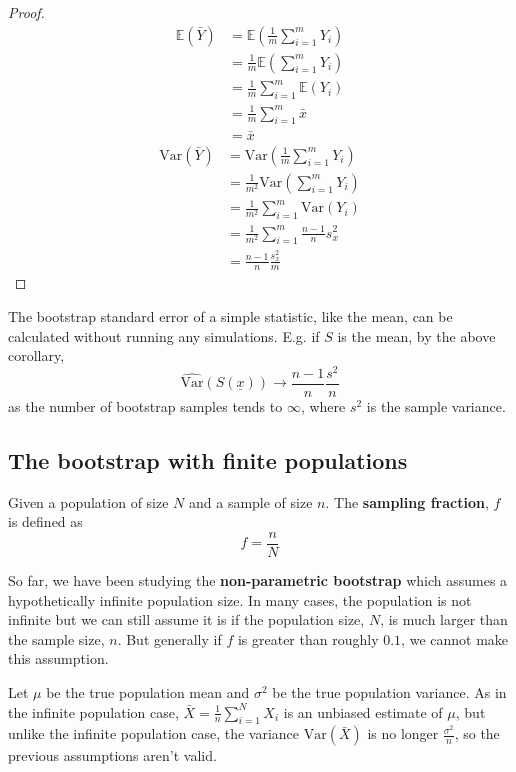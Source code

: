 \begin{proof}
	\[
		\begin{aligned}
			\mathbb{E}(\bar{Y})
				& = \mathbb{E} \left( \frac{1}{m} \sum_{i = 1}^m Y_i \right) \\
				& = \frac{1}{m} \mathbb{E} \left( \sum_{i = 1}^m Y_i \right) \\
				& = \frac{1}{m} \sum_{i = 1}^m \mathbb{E}(Y_i) \\
				& = \frac{1}{m} \sum_{i = 1}^m \bar{x} \\
				& = \bar{x}
		\end{aligned}
	\]
	\[
		\begin{aligned}
			\text{Var}(\bar{Y})
				& = \text{Var} \left( \frac{1}{m} \sum_{i = 1}^m Y_i \right) \\
				& = \frac{1}{m^2} \text{Var} \left( \sum_{i = 1}^m Y_i \right) \\
				& = \frac{1}{m^2} \sum_{i = 1}^m \text{Var}(Y_i) \\
				& = \frac{1}{m^2} \sum_{i = 1}^m \frac{n - 1}{n} s_x^2 \\
				& = \frac{n - 1}{n} \frac{s_x^2}{m}
		\end{aligned}
	\]
\end{proof}

\begin{remark}
	The bootstrap standard error of a simple statistic, like the mean, can be calculated without running any simulations. E.g. if $S$ is the mean, by the above corollary,
	\[
		\widehat{\text{Var}}(S(\underline{x})) \rightarrow \frac{n - 1}{n} \frac{s^2}{n}
	\]
	as the number of bootstrap samples tends to $\infty$, where $s^2$ is the sample variance.
\end{remark}

\subsection{The bootstrap with finite populations}

\begin{definition}
	Given a population of size $N$ and a sample of size $n$. The \textbf{sampling fraction}, $f$ is defined as
	\[
		f = \frac{n}{N}
	\]
\end{definition}

\begin{remark}	
	So far, we have been studying the \textbf{non-parametric bootstrap} which assumes a hypothetically infinite population size. In many cases, the population is not infinite but we can still assume it is if the population size, $N$, is much larger than the sample size, $n$. But generally if $f$ is greater than roughly $0.1$, we cannot make this assumption.
	
	Let $\mu$ be the true population mean and $\sigma^2$ be the true population variance. As in the infinite population case, $\bar{X} = \frac{1}{n} \sum_{i = 1}^{N} X_i$ is an unbiased estimate of $\mu$, but unlike the infinite population case, the variance $\text{Var}(\bar{X})$ is no longer $\frac{\sigma^2}{n}$, so the previous assumptions aren't valid.
\end{remark}
	

